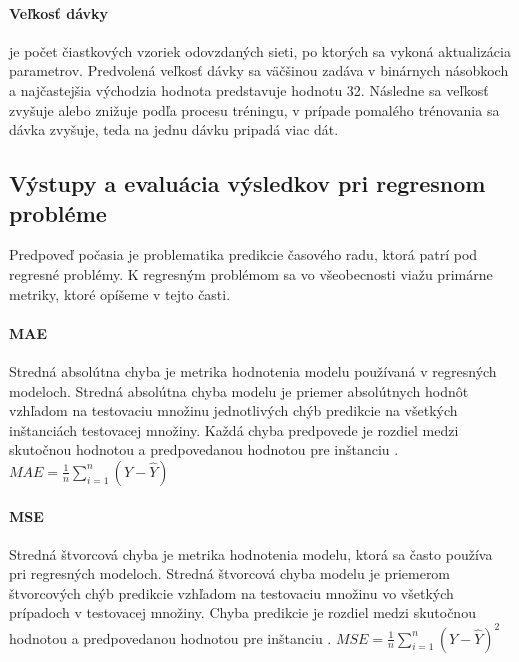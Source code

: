 \paragraph{Veľkosť dávky} je počet čiastkových vzoriek odovzdaných sieti, po ktorých sa vykoná aktualizácia parametrov. Predvolená veľkosť dávky sa väčšinou zadáva v binárnych násobkoch a najčastejšia východzia hodnota predstavuje hodnotu 32. Následne sa veľkosť zvyšuje alebo znižuje podľa procesu tréningu, v prípade pomalého trénovania sa dávka zvyšuje, teda na jednu dávku pripadá viac dát.


\subsection{Výstupy a evaluácia výsledkov pri regresnom probléme}
\label{evaluacia}
Predpoveď počasia je problematika predikcie časového radu, ktorá patrí pod regresné problémy. K regresným problémom sa vo všeobecnosti viažu primárne metriky, ktoré opíšeme v tejto časti.
\paragraph{MAE} Stredná absolútna chyba je metrika hodnotenia modelu používaná v regresných modeloch. Stredná absolútna chyba modelu je priemer absolútnych hodnôt vzhľadom na testovaciu množinu jednotlivých chýb predikcie na všetkých inštanciách testovacej množiny. Každá chyba predpovede je rozdiel medzi skutočnou hodnotou a predpovedanou hodnotou pre inštanciu \cite{mae}. \newline
$MAE = {\frac{1}{n}\sum_{i=1}^{n}(Y-\widehat{Y})}$

\paragraph{MSE} Stredná štvorcová chyba je metrika hodnotenia modelu, ktorá sa často používa pri regresných modeloch. Stredná štvorcová chyba modelu je priemerom štvorcových chýb predikcie vzhľadom na testovaciu množinu vo všetkých prípadoch v testovacej množiny. Chyba predikcie je rozdiel medzi skutočnou hodnotou a predpovedanou hodnotou pre inštanciu \cite{mae}. \newline
$MSE = {\frac{1}{n}\sum_{i=1}^{n}(Y-\widehat{Y})^{2}}$

